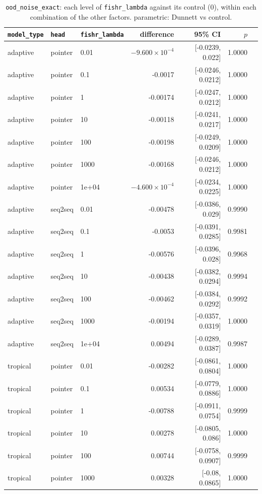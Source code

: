 \documentclass[10pt]{article}
\begin{document}
{\small
\begin{longtable}{lllrrrl}
\caption{\texttt{ood\_noise\_exact}: each level of \texttt{fishr\_lambda} against its control (0), within each combination of the other factors. parametric: Dunnett vs control.}\label{tab:control-ood_noise_exact}\\
\toprule
\texttt{model\_type} & \texttt{head} & \texttt{fishr\_lambda} & difference & 95\% CI & $p$ & \\
\midrule
\endhead
adaptive & pointer & 0.01 & $-9.600\times10^{-4}$ & [-0.0239, 0.022] & 1.0000 & \\
adaptive & pointer & 0.1 & -0.0017 & [-0.0246, 0.0212] & 1.0000 & \\
adaptive & pointer & 1 & -0.00174 & [-0.0247, 0.0212] & 1.0000 & \\
adaptive & pointer & 10 & -0.00118 & [-0.0241, 0.0217] & 1.0000 & \\
adaptive & pointer & 100 & -0.00198 & [-0.0249, 0.0209] & 1.0000 & \\
adaptive & pointer & 1000 & -0.00168 & [-0.0246, 0.0212] & 1.0000 & \\
adaptive & pointer & 1e+04 & $-4.600\times10^{-4}$ & [-0.0234, 0.0225] & 1.0000 & \\
adaptive & seq2seq & 0.01 & -0.00478 & [-0.0386, 0.029] & 0.9990 & \\
adaptive & seq2seq & 0.1 & -0.0053 & [-0.0391, 0.0285] & 0.9981 & \\
adaptive & seq2seq & 1 & -0.00576 & [-0.0396, 0.028] & 0.9968 & \\
adaptive & seq2seq & 10 & -0.00438 & [-0.0382, 0.0294] & 0.9994 & \\
adaptive & seq2seq & 100 & -0.00462 & [-0.0384, 0.0292] & 0.9992 & \\
adaptive & seq2seq & 1000 & -0.00194 & [-0.0357, 0.0319] & 1.0000 & \\
adaptive & seq2seq & 1e+04 & 0.00494 & [-0.0289, 0.0387] & 0.9987 & \\
tropical & pointer & 0.01 & -0.00282 & [-0.0861, 0.0804] & 1.0000 & \\
tropical & pointer & 0.1 & 0.00534 & [-0.0779, 0.0886] & 1.0000 & \\
tropical & pointer & 1 & -0.00788 & [-0.0911, 0.0754] & 0.9999 & \\
tropical & pointer & 10 & 0.00278 & [-0.0805, 0.086] & 1.0000 & \\
tropical & pointer & 100 & 0.00744 & [-0.0758, 0.0907] & 0.9999 & \\
tropical & pointer & 1000 & 0.00328 & [-0.08, 0.0865] & 1.0000 & \\

\end{longtable}}
\end{document}
